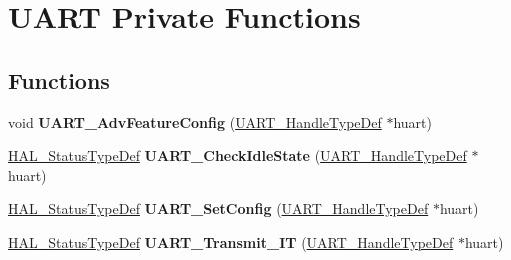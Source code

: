 \hypertarget{group___u_a_r_t___private___functions}{}\section{U\+A\+RT Private Functions}
\label{group___u_a_r_t___private___functions}
\subsection*{Functions}
\begin{DoxyCompactItemize}
\item 
\mbox{\label{group___u_a_r_t___private___functions_gacd304011919c5ccd02544208c7aa451b}} 
void {\bfseries U\+A\+R\+T\+\_\+\+Adv\+Feature\+Config} (\hyperlink{struct_u_a_r_t___handle_type_def}{U\+A\+R\+T\+\_\+\+Handle\+Type\+Def} $\ast$huart)
\item 
\mbox{\label{group___u_a_r_t___private___functions_gad945067db34d4e1c3bd27a14fa8d7d25}} 
\hyperlink{stm32f0xx__hal__def_8h_a63c0679d1cb8b8c684fbb0632743478f}{H\+A\+L\+\_\+\+Status\+Type\+Def} {\bfseries U\+A\+R\+T\+\_\+\+Check\+Idle\+State} (\hyperlink{struct_u_a_r_t___handle_type_def}{U\+A\+R\+T\+\_\+\+Handle\+Type\+Def} $\ast$huart)
\item 
\mbox{\label{group___u_a_r_t___private___functions_ga5a87d1b1c4284cae14f5a1402efaa11b}} 
\hyperlink{stm32f0xx__hal__def_8h_a63c0679d1cb8b8c684fbb0632743478f}{H\+A\+L\+\_\+\+Status\+Type\+Def} {\bfseries U\+A\+R\+T\+\_\+\+Set\+Config} (\hyperlink{struct_u_a_r_t___handle_type_def}{U\+A\+R\+T\+\_\+\+Handle\+Type\+Def} $\ast$huart)
\item 
\mbox{\label{group___u_a_r_t___private___functions_ga8fd08fffe6c3256ac4e373efd2d683dd}} 
\hyperlink{stm32f0xx__hal__def_8h_a63c0679d1cb8b8c684fbb0632743478f}{H\+A\+L\+\_\+\+Status\+Type\+Def} {\bfseries U\+A\+R\+T\+\_\+\+Transmit\+\_\+\+IT} (\hyperlink{struct_u_a_r_t___handle_type_def}{U\+A\+R\+T\+\_\+\+Handle\+Type\+Def} $\ast$huart)
\item 
\mbox{\label{group___u_a_r_t___private___functions_gadb1189f7936c6ee91cff5909e8ea56f4}} 

\end{DoxyCompactItemize}
